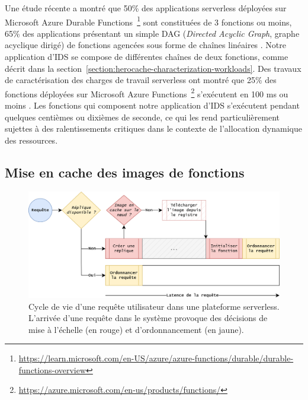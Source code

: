 Une étude récente a montré que 50\% des applications serverless déployées sur Microsoft Azure Durable Functions~\footnote{\href{https://learn.microsoft.com/en-US/azure/azure-functions/durable/durable-functions-overview}{https://learn.microsoft.com/en-US/azure/azure-functions/durable/durable-functions-overview}} sont constituées de 3 fonctions ou moins, 65\% des applications présentant un simple DAG (\textit{Directed Acyclic Graph}, graphe acyclique dirigé) de fonctions agencées sous forme de chaînes linéaires \cite{mahgoubORIONThreeRights}. Notre application d'IDS se compose de différentes chaînes de deux fonctions, comme décrit dans la section~\ref{section:herocache-characterization-workloads}. Des travaux de caractérisation des charges de travail serverless ont montré que 25\% des fonctions déployées sur Microsoft Azure Functions~\footnote{\href{https://azure.microsoft.com/en-us/products/functions/}{https://azure.microsoft.com/en-us/products/functions/}} s'exécutent en 100 ms ou moins \cite{shahradServerlessWildCharacterizing}. Les fonctions qui composent notre application d'IDS s'exécutent pendant quelques centièmes ou dixièmes de seconde, ce qui les rend particulièrement sujettes à des ralentissements critiques dans le contexte de l'allocation dynamique des ressources.

\subsection{Mise en cache des images de fonctions}
\label{section:herocache-background-cache}

\begin{figure}[!ht]
    \centering
    \includegraphics[width=0.8\columnwidth]{5_Chapitre5/figures/function-cache.png}
    \caption{Cycle de vie d'une requête utilisateur dans une plateforme serverless. L'arrivée d'une requête dans le système provoque des décisions de mise à l'échelle (en rouge) et d'ordonnancement (en jaune).}
    \label{figure:herocache-function-cache}
\end{figure}

